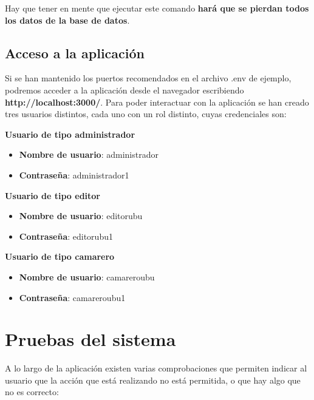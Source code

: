 
Hay que tener en mente que ejecutar este comando \textbf{hará que se pierdan todos los datos de la base de datos}.

\subsection{Acceso a la aplicación}

Si se han mantenido los puertos recomendados en el archivo .env de ejemplo, podremos acceder a la aplicación desde el navegador escribiendo \textbf{http://localhost:3000/}. Para poder interactuar con la aplicación se han creado tres usuarios distintos, cada uno con un rol distinto, cuyas credenciales son:

\textbf{Usuario de tipo administrador}
\begin{itemize}
	\item \textbf{Nombre de usuario}: administrador
	\item \textbf{Contraseña}: administrador1	
\end{itemize}

\textbf{Usuario de tipo editor}
\begin{itemize}
	\item \textbf{Nombre de usuario}: editorubu
	\item \textbf{Contraseña}: editorubu1	
\end{itemize}

\textbf{Usuario de tipo camarero}
\begin{itemize}
	\item \textbf{Nombre de usuario}: camareroubu
	\item \textbf{Contraseña}: camareroubu1	
\end{itemize}


\section{Pruebas del sistema}

A lo largo de la aplicación existen varias comprobaciones que permiten indicar al usuario que la acción que está realizando no está permitida, o que hay algo que no es correcto:

